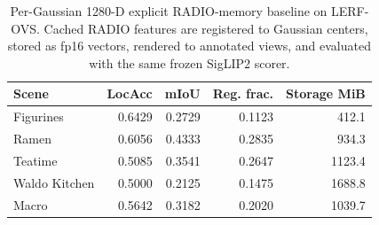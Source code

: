 \begin{table}[t]
\centering
\caption{Per-Gaussian 1280-D explicit RADIO-memory baseline on LERF-OVS. Cached RADIO features are registered to Gaussian centers, stored as fp16 vectors, rendered to annotated views, and evaluated with the same frozen SigLIP2 scorer.}
\label{tab:lerf_per_gaussian_1280d_baseline}
\begin{tabular}{lrrrr}
\toprule
Scene & LocAcc & mIoU & Reg. frac. & Storage MiB \\
\midrule
Figurines & 0.6429 & 0.2729 & 0.1123 & 412.1 \\
Ramen & 0.6056 & 0.4333 & 0.2835 & 934.3 \\
Teatime & 0.5085 & 0.3541 & 0.2647 & 1123.4 \\
Waldo Kitchen & 0.5000 & 0.2125 & 0.1475 & 1688.8 \\
\midrule
Macro & 0.5642 & 0.3182 & 0.2020 & 1039.7 \\
\bottomrule
\end{tabular}
\end{table}

